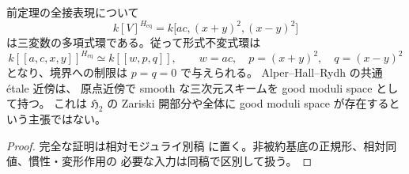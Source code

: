 \begin{corollary}
\label{cor:noncubic-coincident-polynomial-invariants}
前定理の全接表現について
\[
 k[V]^{H_{\mathrm{eq}}}
   =k\bigl[ac,(x+y)^2,(x-y)^2\bigr]
\]
は三変数の多項式環である。従って形式不変式環は
\[
 k[[a,c,x,y]]^{H_{\mathrm{eq}}}
   \simeq k[[w,p,q]],
 \qquad w=ac,\quad p=(x+y)^2,\quad q=(x-y)^2
\]
となり、境界への制限は $p=q=0$ で与えられる。
Alper--Hall--Rydh の共通 \texorpdfstring{\'etale}{etale} 近傍は、
原点近傍で smooth な三次元スキームを good moduli space として持つ。
これは $\mathfrak H_2$ の Zariski 開部分や全体に good moduli space が存在するという主張ではない。
\end{corollary}
\begin{proof}
完全な証明は相対モジュライ別稿
\cite[noncubic 境界の相対表示とモジュライ写像]{QuadricModuli2026}
に置く。非被約基底の正規形、相対同値、慣性・変形作用の
必要な入力は同稿で区別して扱う。
\end{proof}
